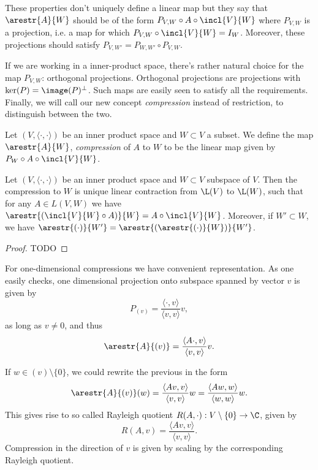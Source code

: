 These properties don't uniquely define a linear map but they say that $\arestr{A}{W}$ should be of the form $P_{V, W} \circ A \circ \incl{V}{W}$ where $P_{V, W}$ is a projection, i.e. a map for which $P_{V, W} \circ \incl{V}{W} = I_{W}$. Moreover, these projections should satisfy $P_{V, W'} = P_{W, W'} \circ P_{V, W}$.

If we are working in a inner-product space, there's rather natural choice for the map $P_{V, W}$: orthogonal projections. Orthogonal projections are projections with $\ker(P) = \image(P)^{\perp}$. Such maps are easily seen to satisfy all the requirements. Finally, we will call our new concept \textit{compression} instead of restriction, to distinguish between the two.

\begin{maar}
	Let $(V, \langle \cdot, \cdot \rangle )$ be an inner product space and $W \subset V$ a subset. We define the map $\arestr{A}{W}$, \textit{compression} of $A$ to $W$ to be the linear map given by $P_{W} \circ A \circ \incl{V}{W}$.
\end{maar}

\begin{lause}
	Let $(V, \langle \cdot, \cdot \rangle)$ be an inner product space and $W \subset V$ subspace of $V$. Then the compression to $W$ is unique linear contraction from $\L(V)$ to $\L(W)$, such that for any $A \in L(V, W)$ we have $\arestr{(\incl{V}{W} \circ A)}{W} = A \circ \incl{V}{W}$. Moreover, if $W' \subset W$, we have $\arestr{(\cdot)}{W'} = \arestr{(\arestr{(\cdot)}{W})}{W'}$.
\end{lause}
\begin{proof}
	TODO
\end{proof}

For one-dimensional compressions we have convenient representation. As one easily checks, one dimensional projection onto subspace spanned by vector $v$ is given by
\[
	P_{(v)} = \frac{\langle \cdot, v \rangle}{\langle v, v \rangle} v,
\]
as long as $v \neq 0$, and thus
\[
	\arestr{A}{(v)} = \frac{\langle A \cdot, v \rangle}{\langle v, v \rangle} v.
\]

If $w \in (v) \setminus \{0\}$, we could rewrite the previous in the form
\[
	\arestr{A}{(v)}(w) = \frac{\langle A v, v\rangle}{\langle v, v\rangle} w = \frac{\langle A w, w\rangle}{\langle w, w \rangle} w.
\]
This gives rise to so called Rayleigh quotient $R(A, \cdot) : V \setminus \{0\} \to \C$, given by
\[
	R(A, v) = \frac{\langle A v, v \rangle}{\langle v, v \rangle}.
\]
Compression in the direction of $v$ is given by scaling by the corresponding Rayleigh quotient.

